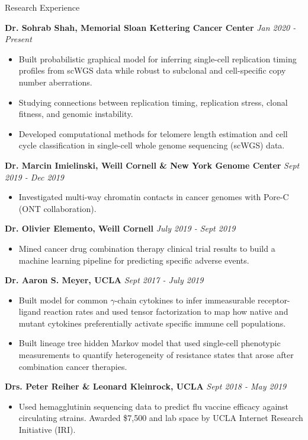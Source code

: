 \documentclass{resume} %
\begin{document}
\begin{rSection}{Research Experience}

{\bf Dr. Sohrab Shah, Memorial Sloan Kettering Cancer Center} \hfill {\em Jan 2020 - Present}
\begin{itemize}
  \item Built probabilistic graphical model for inferring single-cell replication timing profiles from scWGS data while robust to subclonal and cell-specific copy number aberrations.
  \item Studying connections between replication timing, replication stress, clonal fitness, and genomic instability.
  \item Developed computational methods for telomere length estimation and cell cycle classification in single-cell whole genome sequencing (scWGS) data.
\end{itemize}

{\bf Dr. Marcin Imielinski, Weill Cornell \& New York Genome Center} \hfill {\em Sept 2019 - Dec 2019}
\begin{itemize}
  \item Investigated multi-way chromatin contacts in cancer genomes with Pore-C (ONT collaboration).
\end{itemize}

{\bf Dr. Olivier Elemento, Weill Cornell} \hfill {\em July 2019 - Sept 2019}
\begin{itemize}
  \item Mined cancer drug combination therapy clinical trial results to build a machine learning pipeline for predicting specific adverse events.
\end{itemize}

{\bf Dr. Aaron S. Meyer, UCLA} \hfill {\em Sept 2017 - July 2019}
\begin{itemize}
  \item Built model for common $\gamma$-chain cytokines to infer immeasurable receptor-ligand reaction rates and used tensor factorization to map how native and mutant cytokines preferentially activate specific immune cell populations.
  \item Built lineage tree hidden Markov model that used single-cell phenotypic measurements to quantify heterogeneity of resistance states that arose after combination cancer therapies.
\end{itemize}

{\bf Drs. Peter Reiher \& Leonard Kleinrock, UCLA} \hfill {\em Sept 2018 - May 2019}
\begin{itemize}
    \item Used hemagglutinin sequencing data to predict flu vaccine efficacy against circulating strains. Awarded \$7,500 and lab space by UCLA Internet Research Initiative (IRI).
\end{itemize}



\end{rSection}
\end{document}
